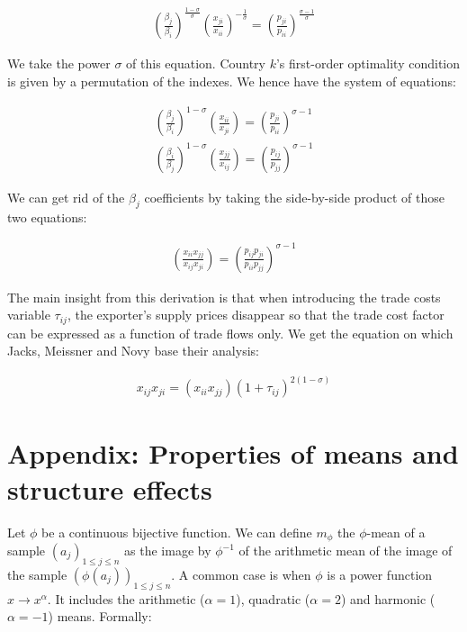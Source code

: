 \documentclass{article}
\begin{document}
\begin{eqnarray*}
\left(\frac{\beta_j}{\beta_i}\right)^{\frac{1-\sigma}{\sigma}}\left(\frac{x_{ji}}{x_{ii}}\right)^{-\frac{1}{\sigma}}=\left(\frac{p_{ji}}{p_{ii}}\right)^{\frac{\sigma-1}{\sigma}}
\end{eqnarray*}

We take the power $\sigma$ of this equation. Country $k$'s
first-order optimality condition is given by a permutation of
the indexes. We hence have the system of equations:

\begin{eqnarray*}
\left(\frac{\beta_j}{\beta_i}\right)^{1-\sigma}\left(\frac{x_{ii}}{x_{ji}}\right)=\left(\frac{p_{ji}}{p_{ii}}\right)^{\sigma-1}\\
\left(\frac{\beta_i}{\beta_j}\right)^{1-\sigma}\left(\frac{x_{jj}}{x_{ij}}\right)=\left(\frac{p_{ij}}{p_{jj}}\right)^{\sigma-1}
\end{eqnarray*}

We can get rid of the $\beta_j$ coefficients by taking the
side-by-side product of those two equations:

\begin{eqnarray*}
\left(\frac{x_{ii} x_{jj}}{x_{ij} x_{ji}}\right)=\left(\frac{p_{ij}
p_{ji}}{p_{ii} p_{jj}}\right)^{\sigma-1}
\end{eqnarray*}

The main insight from this derivation is that when introducing
the trade costs variable $\tau_{ij}$, the exporter's supply
prices disappear so that the trade cost factor can be expressed
as a function of trade flows only. We get the equation on which
Jacks, Meissner and Novy base their analysis:

\begin{eqnarray*}
x_{ij} x_{ji} =(x_{ii} x_{jj}) (1+\tau_{ij})^{2(1-\sigma)}
\end{eqnarray*}

\section{\label{A2}Appendix: Properties of means and structure effects}


Let $\phi$ be a continuous bijective function. We can define
$m_{\phi}$ the $\phi$-mean of a sample $(a_j)_{1\leq j\leq n}$
as the image by $\phi^{-1}$ of the arithmetic mean of the image
of the sample $(\phi(a_j))_{1\leq j\leq n}$. A common case is
when $\phi$ is a power function $x \rightarrow x^\alpha$. It
includes the arithmetic ($\alpha=1$), quadratic ($\alpha=2$)
and harmonic ($\alpha=-1$) means. Formally:
\end{document}
